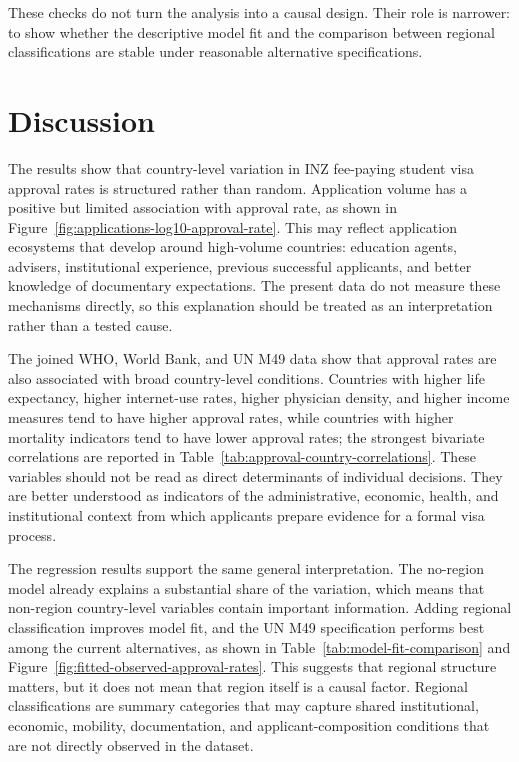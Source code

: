\documentclass[runningheads]{llncs}
\begin{document}
These checks do not turn the analysis into a causal design. Their role is narrower: to show whether the descriptive model fit and the comparison between regional classifications are stable under reasonable alternative specifications.

\section{Discussion}

The results show that country-level variation in INZ fee-paying student visa approval rates is structured rather than random. Application volume has a positive but limited association with approval rate, as shown in Figure~\ref{fig:applications-log10-approval-rate}. This may reflect application ecosystems that develop around high-volume countries: education agents, advisers, institutional experience, previous successful applicants, and better knowledge of documentary expectations. The present data do not measure these mechanisms directly, so this explanation should be treated as an interpretation rather than a tested cause.

The joined WHO, World Bank, and UN M49 data show that approval rates are also associated with broad country-level conditions. Countries with higher life expectancy, higher internet-use rates, higher physician density, and higher income measures tend to have higher approval rates, while countries with higher mortality indicators tend to have lower approval rates; the strongest bivariate correlations are reported in Table~\ref{tab:approval-country-correlations}. These variables should not be read as direct determinants of individual decisions. They are better understood as indicators of the administrative, economic, health, and institutional context from which applicants prepare evidence for a formal visa process.

The regression results support the same general interpretation. The no-region model already explains a substantial share of the variation, which means that non-region country-level variables contain important information. Adding regional classification improves model fit, and the UN M49 specification performs best among the current alternatives, as shown in Table~\ref{tab:model-fit-comparison} and Figure~\ref{fig:fitted-observed-approval-rates}. This suggests that regional structure matters, but it does not mean that region itself is a causal factor. Regional classifications are summary categories that may capture shared institutional, economic, mobility, documentation, and applicant-composition conditions that are not directly observed in the dataset.
\end{document}
